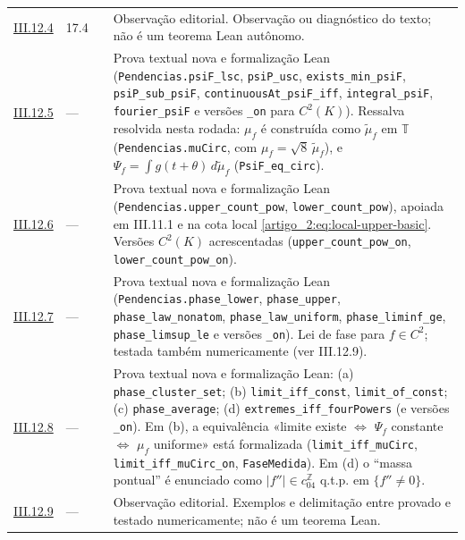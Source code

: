 \documentclass[12pt,a4paper]{article}
\theoremstyle{preciso}
\theoremstyle{definition}
\theoremstyle{preciso}
\theoremstyle{preciso}
\theoremstyle{preciso}
\theoremstyle{preciso}
\theoremstyle{definition}
\theoremstyle{preciso}
\theoremstyle{definition}
\theoremstyle{preciso}
\theoremstyle{preciso}
\theoremstyle{definition}
\begin{document}
\begin{singlespace}
\begin{longtable}{@{}p{.11\linewidth}p{.09\linewidth}p{.09\linewidth}p{.59\linewidth}@{}}
\hyperref[map:artigo_2:12.4]{III.12.4} & 17.4 & \pageref{map:artigo_2:12.4} & Observação editorial. Observação ou diagnóstico do texto; não é um teorema Lean autônomo.\\[4pt]
\hyperref[map:artigo_2:12.5]{III.12.5} & --- & \pageref{map:artigo_2:12.5} & Prova textual nova e formalização Lean (\texttt{Pendencias.psiF\_lsc}, \texttt{psiP\_usc}, \texttt{exists\_min\_psiF}, \texttt{psiP\_sub\_psiF}, \texttt{continuousAt\_psiF\_iff}, \texttt{integral\_psiF}, \texttt{fourier\_psiF} e versões \texttt{\_on} para $C^2(K)$). Ressalva resolvida nesta rodada: $\mu_f$ é construída como $\tilde\mu_f$ em $\mathbb T$ (\texttt{Pendencias.muCirc}, com $\mu_f=\sqrt8\,\tilde\mu_f$), e $\Psi_f=\int g(t+\theta)\,d\tilde\mu_f$ (\texttt{PsiF\_eq\_circ}).\\[4pt]
\hyperref[map:artigo_2:12.6]{III.12.6} & --- & \pageref{map:artigo_2:12.6} & Prova textual nova e formalização Lean (\texttt{Pendencias.upper\_count\_pow}, \texttt{lower\_count\_pow}), apoiada em III.11.1 e na cota local \eqref{artigo_2:eq:local-upper-basic}. Versões $C^2(K)$ acrescentadas (\texttt{upper\_count\_pow\_on}, \texttt{lower\_count\_pow\_on}).\\[4pt]
\hyperref[map:artigo_2:12.7]{III.12.7} & --- & \pageref{map:artigo_2:12.7} & Prova textual nova e formalização Lean (\texttt{Pendencias.phase\_lower}, \texttt{phase\_upper}, \texttt{phase\_law\_nonatom}, \texttt{phase\_law\_uniform}, \texttt{phase\_liminf\_ge}, \texttt{phase\_limsup\_le} e versões \texttt{\_on}). Lei de fase para $f\in C^2$; testada também numericamente (ver III.12.9).\\[4pt]
\hyperref[map:artigo_2:12.8]{III.12.8} & --- & \pageref{map:artigo_2:12.8} & Prova textual nova e formalização Lean: (a) \texttt{phase\_cluster\_set}; (b) \texttt{limit\_iff\_const}, \texttt{limit\_of\_const}; (c) \texttt{phase\_average}; (d) \texttt{extremes\_iff\_fourPowers} (e versões \texttt{\_on}). Em (b), a equivalência «limite existe $\Leftrightarrow$ $\Psi_f$ constante $\Leftrightarrow$ $\mu_f$ uniforme» está formalizada (\texttt{limit\_iff\_muCirc}, \texttt{limit\_iff\_muCirc\_on}, \texttt{FaseMedida}). Em (d) o ``massa pontual'' é enunciado como $|f''|\in c_04^{\mathbb Z}$ q.t.p. em $\{f''\ne0\}$.\\[4pt]
\hyperref[map:artigo_2:12.9]{III.12.9} & --- & \pageref{map:artigo_2:12.9} & Observação editorial. Exemplos e delimitação entre provado e testado numericamente; não é um teorema Lean.\\[4pt]
\bottomrule\end{longtable}\normalsize


\end{singlespace}
\end{document}
